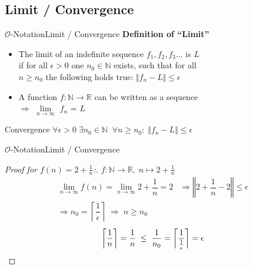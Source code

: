
\subsection{Limit / Convergence}

\begin{frame}{$\mathcal{O}$-Notation}{Limit / Convergence}
  \textbf{Definition of \enquote{Limit}}
  \begin{itemize}
    \item
      The limit of an indefinite sequence $f_1, f_2, f_3$... is $L$\\
      if for all $\epsilon > 0$ one $n_0 \in \mathbb{N}$ exists, such that for all \\
      $n \geq n_0$ the following holds true: $\Vert f_n - L \Vert \leq \epsilon$
    \item
      A function $f\!: \mathbb{N} \rightarrow \mathbb{R}$ can be written as a
      sequence\\
      $\Rightarrow$ $\lim\limits_{n \rightarrow \infty}$ $f_n$ = $L$
  \end{itemize}
  \begin{block}{Convergence}
    \begin{math}
      \forall \epsilon > 0 \; \exists n_0 \in \mathbb{N} \;\;
      \forall n \geq n_0 \! : \; \Vert f_n - L \Vert \leq \epsilon
    \end{math}
  \end{block}
\end{frame}


\begin{frame}{$\mathcal{O}$-Notation}{Limit / Convergence}
  \begin{proof}[Proof for $f(n) = 2 + \frac{1}{n}$:]
    $f\!: \mathbb{N} \to \mathbb{R}, \; n \mapsto 2 + \frac{1}{n}$
    \begin{eqnarray*}
      \lim_{n \to \infty} f(n)
        = \lim_{n \to \infty} 2 + \dfrac{1}{n}
        = 2
      & \Rightarrow \left\Vert 2 + \dfrac{1}{n} - 2 \right\Vert \leq \epsilon\\
      \Rightarrow n_0 = \left\lceil \dfrac{1}{\epsilon} \right\rceil
      \; \Rightarrow \; n \geq n_0
    \end{eqnarray*}
    \begin{eqnarray*}
      \left\lceil
        \frac{1}{n} \vphantom{\dfrac{1}{\frac{1}{\epsilon}}}
      \right\rceil
        = \dfrac{1}{n}
      \; \leq \;
      \dfrac{1}{n_0} = \left\lceil \dfrac{1}{\frac{1}{\epsilon}} \right\rceil
        = \epsilon
      \qedhere
    \end{eqnarray*}
  \end{proof}
\end{frame}

